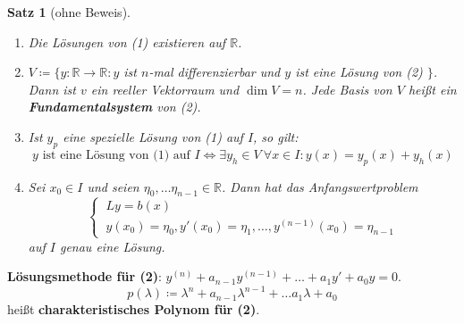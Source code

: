 \documentclass[12pt]{extreport} %
\newcommand{\R}{\mathbb{R}}
\theoremstyle{named}
\theoremstyle{nnamed}
\theoremstyle{itshape}
\newtheorem{satz}[unnamedtheorem]{Satz}
\theoremstyle{normal}
\begin{document}
\begin{satz}[ohne Beweis] ~\ \label{23.1:satz}
	\begin{enumerate}
		\item Die Lösungen von (1) existieren auf $\R$.
		\item $V \coloneqq \big\{ y \colon \R \rightarrow \R \colon y$ ist $n$-mal differenzierbar und $y$ ist eine Lösung von (2) $\big\}$. Dann ist $v$ ein reeller Vektorraum und $\dim V = n$. Jede Basis von $V$ hei{\ss}t ein \textbf{Fundamentalsystem} von (2).
		\item Ist $y_{p}$ eine spezielle Lösung von (1) auf $I$, so gilt:
			$$ y \text{ ist eine Lösung von (1) auf } I \iff \exists y_{h} \in V ~\forall x \in I: y(x) = y_{p}(x) + y_{h}(x) $$
		\item Sei $x_{0} \in I$ und seien $\eta_{0}, \dotsc \eta_{n-1} \in \R$. Dann hat das Anfangswertproblem
			$$ \begin{cases} ~Ly = b(x) \\ ~y(x_{0}) = \eta_{0}, y'(x_{0}) = \eta_{1}, \dotsc, y^{(n-1)}(x_{0}) = \eta_{n-1} \end{cases} $$
			auf $I$ genau eine Lösung.
	\end{enumerate}	
\end{satz}

\textbf{Lösungsmethode für (2)}: $y^{(n)} + a_{n-1}y^{(n-1)} + \dotsc + a_{1} y' + a_{0} y = 0$.
	$$ p(\lambda) \coloneqq \lambda^{n} + a_{n-1} \lambda^{n-1} + \dotsc a_{1} \lambda + a_{0} $$
hei{\ss}t \textbf{charakteristisches Polynom für (2)}.

\bigskip
\end{document}
